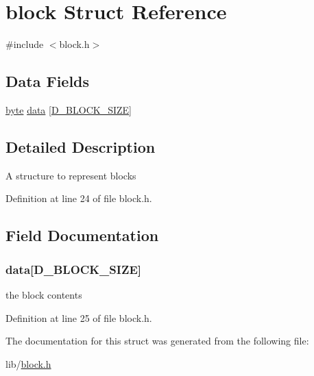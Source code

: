 \hypertarget{structblock}{}\section{block Struct Reference}
\label{structblock}


{\ttfamily \#include $<$block.\+h$>$}

\subsection*{Data Fields}
\begin{DoxyCompactItemize}
\item 
\hyperlink{block_8h_ab8ef12fab634c171394422d0ee8baf94}{byte} \hyperlink{structblock_aa8d1c17b01c4321a04e560f08ed3b230}{data} \mbox{[}\hyperlink{block_8h_a96e92341ab86353244d3e0a6414818aa}{D\+\_\+\+B\+L\+O\+C\+K\+\_\+\+S\+I\+Z\+E}\mbox{]}
\end{DoxyCompactItemize}


\subsection{Detailed Description}
A structure to represent blocks 

Definition at line 24 of file block.\+h.



\subsection{Field Documentation}
\hypertarget{structblock_aa8d1c17b01c4321a04e560f08ed3b230}{}
\subsubsection[{data}]{ data\mbox{[}{\bf D\+\_\+\+B\+L\+O\+C\+K\+\_\+\+S\+I\+Z\+E}\mbox{]}}\label{structblock_aa8d1c17b01c4321a04e560f08ed3b230}
the block contents 

Definition at line 25 of file block.\+h.



The documentation for this struct was generated from the following file\+:\begin{DoxyCompactItemize}
\item 
lib/\hyperlink{block_8h}{block.\+h}\end{DoxyCompactItemize}

